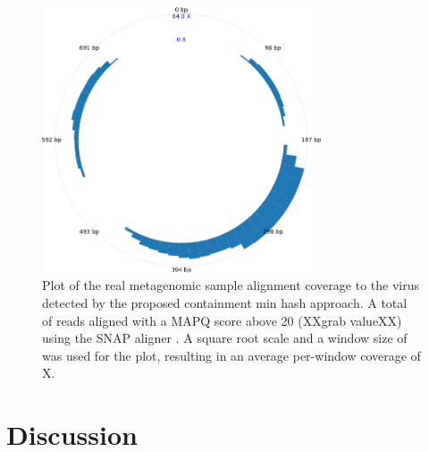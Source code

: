 \documentclass[11pt]{amsart}
\theoremstyle{remark}
\numberwithin{equation}{section}
\newcommand{\FoundOrganismName}{\protect }
\newcommand{\MeanCoverage}{\protect }
\newcommand{\NumReadsAligned}{\protect }
\newcommand{\WindowSize}{\protect }
\begin{document}
\begin{figure}[!h]%
\begin{center}
\includegraphics[width=3.25in,trim={0 0 0 0in},clip]{Figs/CoveragePlot.png}%
\end{center}
\caption{Plot of the real metagenomic sample alignment coverage to the virus \textit{\FoundOrganismName} detected by the proposed containment min hash approach. A total of \NumReadsAligned reads aligned with a MAPQ score above 20 (XXgrab valueXX) using the SNAP aligner \cite{zaharia2011faster}. A square root scale and a window size of \WindowSize was used for the plot, resulting in an average per-window coverage of \MeanCoverage \unskip X.
}
\label{fig:ViralCoverage}%
\end{figure}

\section{Discussion}


\clearpage
{}

\end{document}
